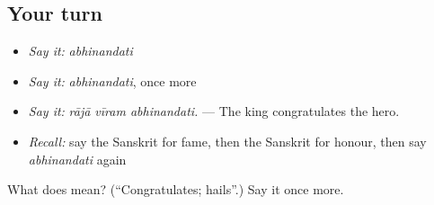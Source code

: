 \subsection*{Your turn}
\begin{itemize}
\raggedright
  \item \emph{Say it:} \emph{abhinandati}
  \item \emph{Say it:} \emph{abhinandati}, once more
  \item \emph{Say it:} \emph{rājā vīram abhinandati.} — The king congratulates the hero.
  \item \emph{Recall:} say the Sanskrit for fame, then the Sanskrit for honour, then say \emph{abhinandati} again
\end{itemize}

\begin{tcolorbox}[breakable,colback=teal!4,colframe=teal!35!black,title={Before you move on}]
What does  mean? (\textquotedblleft{}Congratulates; hails\textquotedblright{}.) Say it once more.
\end{tcolorbox}
